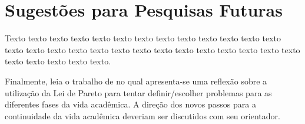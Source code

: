 \section{Sugestões para Pesquisas Futuras} 

Texto texto texto texto texto texto texto texto texto texto texto texto texto
texto texto texto texto texto texto texto texto texto texto texto texto texto
texto texto texto texto texto texto.

Finalmente, leia o trabalho de \citet{alon09:how} no qual apresenta-se
uma reflexão sobre a utilização da Lei de Pareto para tentar definir/escolher
problemas para as diferentes fases da vida acadêmica.  A direção dos novos
passos para a continuidade da vida acadêmica deveriam ser discutidos com seu
orientador.

